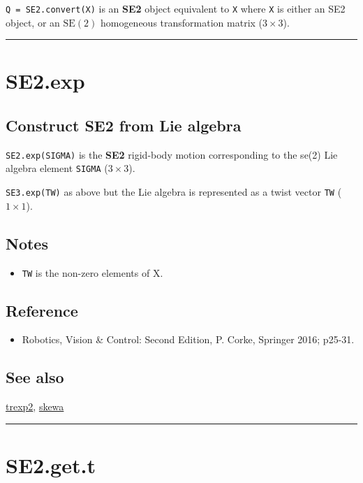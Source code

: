 \texttt{Q = SE2.convert(X)} is an \textbf{\color{red} SE2} object equivalent to \texttt{X} where \texttt{X} is either
an SE2 object, or an $\mbox{SE}(2)$ homogeneous transformation matrix ($3 \times 3$).

\vspace{1.5ex}\hrule

\hypertarget{SE2.exp}{\section*{SE2.exp}}
\subsection*{Construct SE2 from Lie algebra}


\texttt{SE2.exp(SIGMA)} is the \textbf{\color{red} SE2} rigid-body motion corresponding to the se(2)
Lie algebra element \texttt{SIGMA} ($3 \times 3$).



\texttt{SE3.exp(TW)} as above but the Lie algebra is represented
as a twist vector \texttt{TW} ($1 \times 1$).


\subsection*{Notes}
\begin{itemize}
  \item \texttt{TW} is the non-zero elements of X.
\end{itemize}

\subsection*{Reference}
\begin{itemize}
  \item Robotics, Vision \& Control: Second Edition, P. Corke, Springer 2016; p25-31.
\end{itemize}

\subsection*{See also}


\hyperlink{trexp2}{\color{blue} trexp2}, \hyperlink{skewa}{\color{blue} skewa}

\vspace{1.5ex}\hrule

\hypertarget{SE2.get.t}{\section*{SE2.get.t}}
